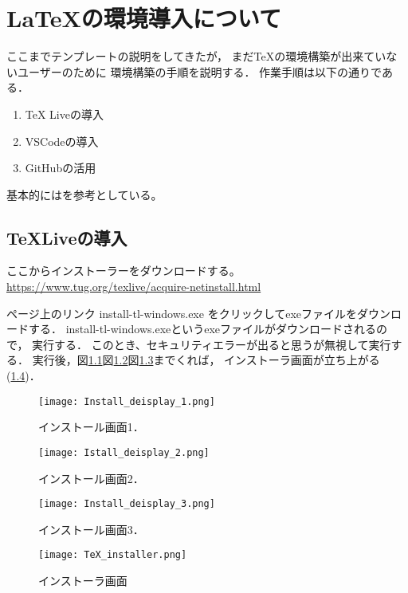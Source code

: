 \chapter{\LaTeX の環境導入について}
ここまでテンプレートの説明をしてきたが，
まだTeXの環境構築が出来ていないユーザーのために
環境構築の手順を説明する．
作業手順は以下の通りである．
\begin{enumerate}
  \item TeX Liveの導入
  \item VSCodeの導入
  \item GitHubの活用
\end{enumerate}
基本的には\cite{Tex_bilud}を参考としている。

\section{TeXLiveの導入}
ここからインストーラーをダウンロードする。
\url{https://www.tug.org/texlive/acquire-netinstall.html}

ページ上のリンク install-tl-windows.exe 
をクリックしてexeファイルをダウンロードする．
install-tl-windows.exeというexeファイルがダウンロードされるので，
実行する．
このとき、セキュリティエラーが出ると思うが無視して実行する．
実行後，図\ref{fig:install_deisplay_1}図\ref{fig:install_deisplay_2}図\ref{fig:install_deisplay_3}までくれば，
インストーラ画面が立ち上がる(\ref{fig:tex_installer})．
\begin{figure}[H]
    \centering
    \texttt{[image: Install\_deisplay\_1.png]}
    \caption{インストール画面1．}
    \label{fig:install_deisplay_1}
\end{figure}

\begin{figure}[H]
  \centering
  \texttt{[image: Istall\_deisplay\_2.png]}
  \caption{インストール画面2．}
  \label{fig:install_deisplay_2}
\end{figure}

\begin{figure}[H]
  \centering
  \texttt{[image: Install\_deisplay\_3.png]}
  \caption{インストール画面3．}
  \label{fig:install_deisplay_3}
\end{figure}

\begin{figure}[H]
  \centering
  \texttt{[image: TeX\_installer.png]}
  \caption{インストーラ画面}
  \label{fig:tex_installer}
\end{figure}


